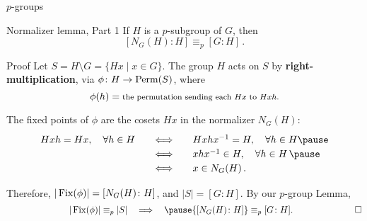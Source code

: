 \documentclass[8pt, handout]{beamer}
\newcommand{\Pause}{\pause}      %
\begin{document}
\begin{frame}{$p$-groups} \medskip

  \begin{block}{Normalizer lemma, Part 1}
    If $H$ is a $p$-subgroup of $G$, then \vspace{-1mm}
    \[
    [N_G(H)\colon H]\equiv_p[G\colon H]\,.
    \]
    $\;$\vspace{-0.4cm}
  \end{block}

  \vspace{-1mm}

  \begin{exampleblock}{Proof}
    Let $S=H\!\setminus\!G=\{Hx\mid x\in G\}$. \Pause The group $H$
    acts on $S$ by \textbf{right-multiplication}, via $\phi\colon
    H\to\operatorname{Perm}(S)$, where
    \[
    \phi(h)=\mbox{\footnotesize the permutation sending each $Hx$ to
      $Hxh$.}
    \]
    
    \pause
    
    The {\color{xGreen}fixed points} of $\phi$ are the cosets $Hx$
    in the {\color{xGreen}normalizer $N_G(H)$}: \Pause\vspace{-2mm}
    \[
    \renewcommand{\arraystretch}{1.2}
    \begin{array}{lll}
      Hxh=Hx,\quad\forall h\in H\quad & \Longleftrightarrow\quad &
      Hxhx^{-1}=H,\quad\forall h\in H\Pause
      \\ & \Longleftrightarrow\quad & xhx^{-1}\in H,\quad\forall h\in H\,
      \Pause \\ & \Longleftrightarrow\quad & x\in N_G(H)\,.
    \end{array}
    \]

    \pause
    
    Therefore, $|\operatorname{Fix}(\phi)|=[N_G(H)\colon H]$, and
    $|S|=[G:H]$. \Pause By our $p$-group Lemma,
    \[
    \quad\qquad\qquad\qquad|\Fix(\phi)|\equiv_p|S|
    \quad\Longrightarrow\quad\Pause {[N_G(H)\colon H]}\equiv_p[G\colon H].
    \qquad\qquad\qquad\quad\Box
    \] \vspace{-4mm}
  \end{exampleblock}
  
\end{frame}

\end{document}
